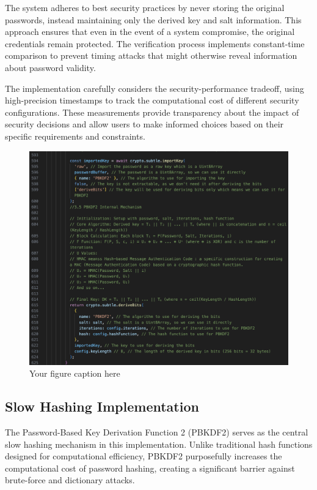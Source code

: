 \documentclass[11pt,a4paper]{article}
\begin{document}
The system adheres to best security practices by never storing the original passwords, instead maintaining only the derived key and salt information. This approach ensures that even in the event of a system compromise, the original credentials remain protected. The verification process implements constant-time comparison to prevent timing attacks that might otherwise reveal information about password validity.

The implementation carefully considers the security-performance tradeoff, using high-precision timestamps to track the computational cost of different security configurations. These measurements provide transparency about the impact of security decisions and allow users to make informed choices based on their specific requirements and constraints.
\begin{figure}[htbp]
    \centering
    \includegraphics[width=1\linewidth]{images/Algo.png}
    \caption{Your figure caption here}
    \label{fig:your-label}
\end{figure}
\subsection{Slow Hashing Implementation}
The Password-Based Key Derivation Function 2 (PBKDF2) serves as the central slow hashing mechanism in this implementation. Unlike traditional hash functions designed for computational efficiency, PBKDF2 purposefully increases the computational cost of password hashing, creating a significant barrier against brute-force and dictionary attacks.
\end{document}
